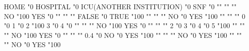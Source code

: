 \documentclass{article}\usepackage[]{graphicx}\usepackage[]{color}
\begin{document}
HOME                                "0%
HOSPITAL                            "0%
ICU(ANOTHER INSTITUTION)            "0%
SNF                                 "0%
                                    ""     ""             ""     
NO                                  "100%
YES                                 "0%
                                    ""     ""             ""     
FALSE                               "0%
TRUE                                "100%
                                    ""     ""             ""     
NO                                  "0%
YES                                 "100%
                                    ""     ""             ""     
0                                   "0%
1                                   "0%
2                                   "100%
3                                   "0%
4                                   "0%
                                    ""     ""             ""     
NO                                  "100%
YES                                 "0%
                                    ""     ""             ""     
2                                   "0%
3                                   "0%
4                                   "0%
5                                   "100%
                                    ""     ""             ""     
NO                                  "100%
YES                                 "0%
                                    ""     ""             ""     
0.4                                 "0%
NO                                  "0%
YES                                 "100%
                                    ""     ""             ""     
NO                                  "0%
YES                                 "100%
                                    ""     ""             ""     
NO                                  "0%
YES                                 "100%
\end{document}
